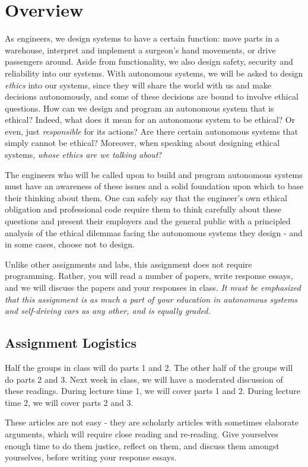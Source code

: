 \documentclass[letta4 paper]{article}
\numberwithin{equation}{section}
\newcommand{\0}{\mathbf{0}}
\begin{document}
	\section{Overview}
	As engineers, we design systems to have a certain function: move parts in a warehouse, interpret and implement a surgeon's hand  movements, or drive passengers around. 
	Aside from functionality, we also design safety, security and reliability into our systems.
	With autonomous systems, we will be asked to design \textit{ethics} into our systems, since they will share the world with us and make decisions autonomously, and some of these decisions are bound to involve ethical questions. 
	How can we design and program an autonomous system that is ethical? 
	Indeed, what does it mean for an autonomous system to be ethical? 
	Or even, just \textit{responsible} for its actions?
	Are there certain autonomous systems that simply cannot be ethical?
	Moreover, when speaking about designing ethical systems, \textit{whose ethics are we talking about}? 
	
	The engineers who will be called upon to build and program autonomous systems must have an awareness of these issues and a solid foundation upon which to base their thinking about them.
	One can safely say that the engineer's own ethical obligation and professional code require them to think carefully about these questions and present their employers and the general public with a principled analysis of the ethical dilemmas facing the autonomous systems they design - and in some cases, choose not to design.
	
 
	Unlike other assignments and labs, this assignment does not require programming. 
	Rather, you will read a number of papers, write response essays, and we will discuss the papers and your responses in class.
	\textit{It must be emphasized that this assignment is as much a part of your education in autonomous systems and self-driving cars as any other, and is equally graded. }

	\subsection{Assignment Logistics}
	Half the groups in class will do parts 1 and 2. 
	The other half of the groups will do parts 2 and 3.
	Next week in class, we will have a moderated discussion of these readings. 
	During lecture time 1, we will cover parts 1 and 2.
	During lecture time 2, we will cover parts 2 and 3.
	
	These articles are not easy - they are scholarly articles with sometimes elaborate arguments, which will require close reading and re-reading. 
	Give yourselves enough time to do them justice, reflect on them, and discuss them amongst yourselves, before writing your response essays. 
	\\
	
\end{document}
